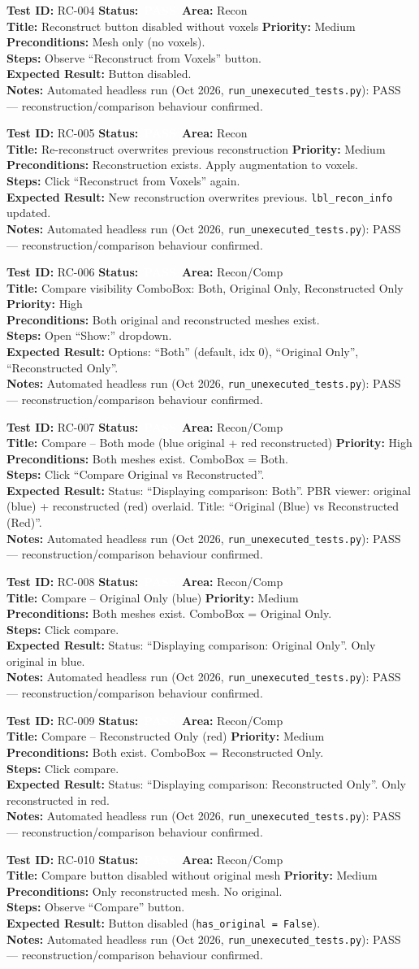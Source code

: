 \documentclass[12pt,a4paper]{article}
\newcommand{\statuspass}{\colorbox{statusgreen}{\textcolor{white}{\textbf{\,PASS\,}}}}
\newcommand{\testcase}[9]{%
  \smallskip
  \noindent\textbf{Test ID:} #1 \hfill \textbf{Status:} #2 \hfill \textbf{Area:} #3 \\
  \textbf{Title:} #4 \hfill \textbf{Priority:} #5 \\[0.3em]
  \textbf{Preconditions:} #6 \\[0.3em]
  \textbf{Steps:} #7 \\[0.3em]
  \textbf{Expected Result:} #8 \\
  \textbf{Notes:} #9
  \smallskip
}
\begin{document}
\testcase{RC-004}{\statuspass}{Recon}{Reconstruct button disabled without voxels}{Medium}{Mesh only (no voxels).}{Observe ``Reconstruct from Voxels'' button.}{Button disabled.}{Automated headless run (Oct 2026, \texttt{run\_unexecuted\_tests.py}): PASS --- reconstruction/comparison behaviour confirmed.}


\testcase{RC-005}{\statuspass}{Recon}{Re-reconstruct overwrites previous reconstruction}{Medium}{Reconstruction exists. Apply augmentation to voxels.}{Click ``Reconstruct from Voxels'' again.}{New reconstruction overwrites previous. \texttt{lbl\_recon\_info} updated.}{Automated headless run (Oct 2026, \texttt{run\_unexecuted\_tests.py}): PASS --- reconstruction/comparison behaviour confirmed.}


\testcase{RC-006}{\statuspass}{Recon/Comp}{Compare visibility ComboBox: Both, Original Only, Reconstructed Only}{High}{Both original and reconstructed meshes exist.}{Open ``Show:'' dropdown.}{Options: ``Both'' (default, idx 0), ``Original Only'', ``Reconstructed Only''.}{Automated headless run (Oct 2026, \texttt{run\_unexecuted\_tests.py}): PASS --- reconstruction/comparison behaviour confirmed.}


\testcase{RC-007}{\statuspass}{Recon/Comp}{Compare -- Both mode (blue original + red reconstructed)}{High}{Both meshes exist. ComboBox = Both.}{Click ``Compare Original vs Reconstructed''.}{Status: ``Displaying comparison: Both''. PBR viewer: original (blue) + reconstructed (red) overlaid. Title: ``Original (Blue) vs Reconstructed (Red)''.}{Automated headless run (Oct 2026, \texttt{run\_unexecuted\_tests.py}): PASS --- reconstruction/comparison behaviour confirmed.}


\testcase{RC-008}{\statuspass}{Recon/Comp}{Compare -- Original Only (blue)}{Medium}{Both meshes exist. ComboBox = Original Only.}{Click compare.}{Status: ``Displaying comparison: Original Only''. Only original in blue.}{Automated headless run (Oct 2026, \texttt{run\_unexecuted\_tests.py}): PASS --- reconstruction/comparison behaviour confirmed.}


\testcase{RC-009}{\statuspass}{Recon/Comp}{Compare -- Reconstructed Only (red)}{Medium}{Both exist. ComboBox = Reconstructed Only.}{Click compare.}{Status: ``Displaying comparison: Reconstructed Only''. Only reconstructed in red.}{Automated headless run (Oct 2026, \texttt{run\_unexecuted\_tests.py}): PASS --- reconstruction/comparison behaviour confirmed.}


\testcase{RC-010}{\statuspass}{Recon/Comp}{Compare button disabled without original mesh}{Medium}{Only reconstructed mesh. No original.}{Observe ``Compare'' button.}{Button disabled (\texttt{has\_original = False}).}{Automated headless run (Oct 2026, \texttt{run\_unexecuted\_tests.py}): PASS --- reconstruction/comparison behaviour confirmed.}
\end{document}
